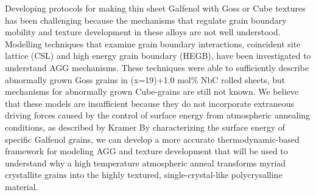  Developing protocols for making thin sheet Galfenol with Goss or Cube textures has been challenging because the mechanisms that regulate grain boundary mobility and texture development in these alloys are not well understood. Modelling techniques that examine grain boundary interactions, coincident site lattice (CSL) and high energy grain boundary (HEGB), have been investigated to understand AGG mechanisms. These techniques were able to sufficiently describe abnormally grown Goss grains in \fegacomp(x=19)+1.0 mol\% NbC rolled sheets, but mechanisms for abnormally grown Cube-grains are still not known.\cite{Chun2010} We believe that these models are insufficient because they do not incorporate extraneous driving forces caused by the control of surface energy from atmospheric annealing conditions, as described by Kramer \etal By characterizing the surface energy of specific Galfenol grains, we can develop a more accurate thermodynamic-based framework for modeling AGG and texture development that will be used to understand why a high temperature atmospheric anneal transforms myriad crystallite grains into the highly textured, single-crystal-like polycrysalline material. 






 




